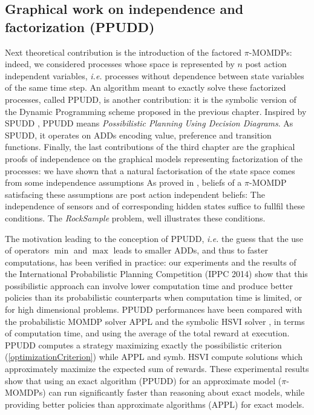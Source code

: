 \subsection*{Graphical work on independence and factorization (PPUDD)}
Next theoretical contribution is 
the introduction of the factored $\pi$-MOMDPs:
indeed, we considered processes
whose space is represented by $n$ 
post action independent variables,
\textit{i.e.} processes without dependence
between state variables of the same time step.
An algorithm meant to exactly solve 
these factorized processes,
called PPUDD, is another contribution:
it is the symbolic version of 
the Dynamic Programming scheme 
proposed in the previous chapter.
Inspired by SPUDD \cite{Hoey99spudd:stochastic}, 
PPUDD means \emph{Possibilistic Planning Using Decision Diagrams}. 
As SPUDD, it operates on ADDs 
encoding value, preference and transition functions.
Finally, the last contributions of the third chapter
are the graphical proofs of independence
on the graphical models representing
factorization of the processes:
we have shown that
a natural factorisation of the state space 
comes from some independence assumptions
As proved in \cite{DBLP:conf/aaai/DrougardTFD14}, 
beliefs of a $\pi$-MOMDP satisfacing these assumptions
are post action independent beliefs: 
The independence of sensors 
and of corresponding hidden states 
suffice to fullfil these conditions.
The \textit{RockSample} problem, 
well illustrates these conditions.

The motivation leading to the conception of PPUDD,
\textit{i.e.} the guess that the use of operators $\min$ and $\max$ 
leads to smaller ADDs, and thus to faster computations,
has been verified in practice:
our experiments and the results 
of the International Probabilistic Planning Competition (IPPC 2014)
show that this possibilistic approach
can involve lower computation time
and produce better policies
than its probabilistic counterparts
when computation time is limited,
or for high dimensional problems.
PPUDD performances have been compared 
with the probabilistic MOMDP solver APPL \cite{Kurniawati-RSS08,OngShaoHsuWee-IJRR10}
and the symbolic HSVI solver \cite{Sim:2008:SHS:1620163.1620241},
in terms of computation time, 
and using the average of 
the total reward at execution. 
PPUDD computes a strategy maximizing 
exactly the possibilistic criterion 
(\ref{optimizationCriterion})
while APPL and symb. HSVI compute solutions
which approximately maximize the expected sum of rewards.
These experimental results show that using an exact algorithm 
(PPUDD) for an approximate model ($\pi$-MOMDPs) 
can run significantly faster 
than reasoning about exact models, 
while providing better policies 
than approximate algorithms (APPL) 
for exact models.

